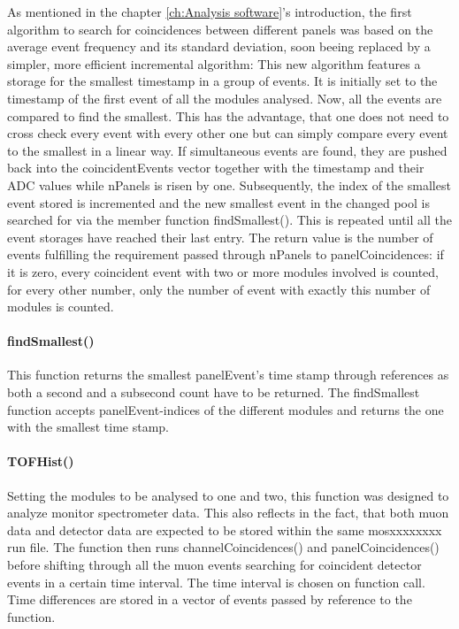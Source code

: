     As mentioned in the chapter \ref{ch:Analysis software}'s introduction, the first algorithm to search for coincidences between different panels was based on the average event frequency and its standard deviation, soon beeing replaced by a simpler, more efficient incremental algorithm:
    This new algorithm features a storage for the smallest timestamp in a group of events. It is initially set to the timestamp of the first event of all the modules analysed. Now, all the events are compared to find the smallest. This has the advantage, that one does not need to cross check every event with every other one but can simply compare every event to the smallest in a linear way. If simultaneous events are found, they are pushed back into the coincidentEvents vector together with the timestamp and their ADC values while nPanels is risen by one. Subsequently, the index of the smallest event stored is incremented and the new smallest event in the changed pool is searched for via the member function findSmallest(). This is repeated until all the event storages have reached their last entry.
    The return value is the number of events fulfilling the requirement passed through nPanels to panelCoincidences: if it is zero, every coincident event with two or more modules involved is counted, for every other number, only the number of event with exactly this number of modules is counted.

    \paragraph{findSmallest()}
    \label{ch:Analysis software:sec:methods of the class run:subsec:findSmallest()}
    
    This function returns the smallest panelEvent's time stamp through references as both a second and a subsecond count have to be returned. The findSmallest function accepts panelEvent-indices of the different modules and returns the one with the smallest time stamp. 
    
    \paragraph{TOFHist()}
    \label{ch:Analysis software:sec:methods of the class run:subsec:TOFHist()}
    
    Setting the modules to be analysed to one and two, this function was designed to analyze monitor spectrometer data. This also reflects in the fact, that both muon data and detector data are expected to be stored within the same mosxxxxxxxx run file. The function then runs channelCoincidences() and panelCoincidences() before shifting through all the muon events searching for coincident detector events in a certain time interval. The time interval is chosen on function call. Time differences are stored in a vector of events passed by reference to the function.
    
